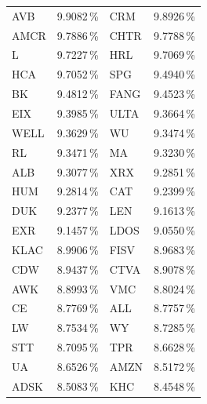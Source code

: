 \begin{longtable}{l c | l c}
    AVB    & 9.9082\,\%             & CRM    & 9.8926\,\%                                    \\
    AMCR   & 9.7886\,\%             & CHTR   & 9.7788\,\%                                    \\
    L      & 9.7227\,\%             & HRL    & 9.7069\,\%                                    \\
    HCA    & 9.7052\,\%             & SPG    & 9.4940\,\%                                    \\
    BK     & 9.4812\,\%             & FANG   & 9.4523\,\%                                    \\
    EIX    & 9.3985\,\%             & ULTA   & 9.3664\,\%                                    \\
    WELL   & 9.3629\,\%             & WU     & 9.3474\,\%                                    \\
    RL     & 9.3471\,\%             & MA     & 9.3230\,\%                                    \\
    ALB    & 9.3077\,\%             & XRX    & 9.2851\,\%                                    \\
    HUM    & 9.2814\,\%             & CAT    & 9.2399\,\%                                    \\
    DUK    & 9.2377\,\%             & LEN    & 9.1613\,\%                                    \\
    EXR    & 9.1457\,\%             & LDOS   & 9.0550\,\%                                    \\
    KLAC   & 8.9906\,\%             & FISV   & 8.9683\,\%                                    \\
    CDW    & 8.9437\,\%             & CTVA   & 8.9078\,\%                                    \\
    AWK    & 8.8993\,\%             & VMC    & 8.8024\,\%                                    \\
    CE     & 8.7769\,\%             & ALL    & 8.7757\,\%                                    \\
    LW     & 8.7534\,\%             & WY     & 8.7285\,\%                                    \\
    STT    & 8.7095\,\%             & TPR    & 8.6628\,\%                                    \\
    UA     & 8.6526\,\%             & AMZN   & 8.5172\,\%                                    \\
    ADSK   & 8.5083\,\%             & KHC    & 8.4548\,\%                                    \\

\end{longtable}
